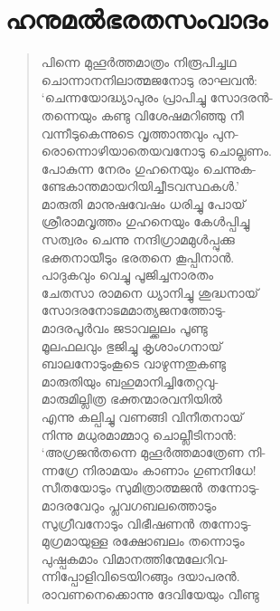 
\section{ഹനുമല്‍ഭരതസംവാദം}

\begin{verse}
പിന്നെ മുഹൂര്‍ത്തമാത്രം നിരൂപിച്ചഥ\\
ചൊന്നാനനിലാത്മജനോടു രാഘവന്‍:\\
‘ചെന്നയോദ്ധ്യാപുരം പ്രാപിച്ചു സോദരന്‍-\\
തന്നെയും കണ്ടു വിശേഷമറിഞ്ഞു നീ\\
വന്നീടുകെന്നുടെ വൃത്താന്തവും പുന-\\
രൊന്നൊഴിയാതെയവനോടു ചൊല്ലണം.\\
പോകുന്ന നേരം ഗുഹനെയും ചെന്നുക-\\
ണ്ടേകാന്തമായറിയിച്ചീടവസ്ഥകള്‍.’\\
മാരുതി മാനുഷവേഷം ധരിച്ചു പോയ്\\
ശ്രീരാമവൃത്തം ഗുഹനെയും കേള്‍പ്പിച്ചു\\
സത്വരം ചെന്നു നന്ദിഗ്രാമമുള്‍പ്പുക്കു\\
ഭക്തനായീടും ഭരതനെ കൂപ്പിനാന്‍.\\
പാദുകവും വെച്ചു പൂജിച്ചനാരതം\\
ചേതസാ രാമനെ ധ്യാനിച്ചു ശുദ്ധനായ്\\
സോദരനോടൃമമാത്യജനത്തോടു-\\
മാദരപൂര്‍വം ജടാവല്ക്കലം പൂണ്ടു\\
മൂലഫലവും ഭുജിച്ചു കൃശാംഗനായ്\\
ബാലനോടുംകൂടെ വാഴുന്നതുകണ്ടു\\
മാരുതിയും ബഹുമാനിച്ചിതേറ്റവു-\\
മാരുമില്ലിത്ര ഭക്തന്മാരവനിയില്‍\\
എന്നു കല്പിച്ചു വണങ്ങി വിനീതനായ്\\
നിന്നു മധുരമാമ്മാറു ചൊല്ലീടിനാന്‍:\\
‘അഗ്രജന്‍തന്നെ മുഹൂര്‍ത്തമാത്രേണ നി-\\
ന്നഗ്രേ നിരാമയം കാണാം ഗുണനിധേ!\\
സീതയോടും സുമിത്രാത്മജന്‍ തന്നോടു-\\
മാദരവേറും പ്ലവഗബലത്തൊടും\\
സുഗ്രീവനോടും വിഭീഷണന്‍ തന്നോടു-\\
മുഗ്രമായുള്ള രക്ഷോബലം തന്നൊടും\\
പുഷ്പകമാം വിമാനത്തിന്മേലേറിവ-\\
ന്നിപ്പോളിവിടെയിറങ്ങും ദയാപരന്‍.\\
രാവണനെക്കൊന്നു ദേവിയേയും വീണ്ടു\\

\end{verse}
